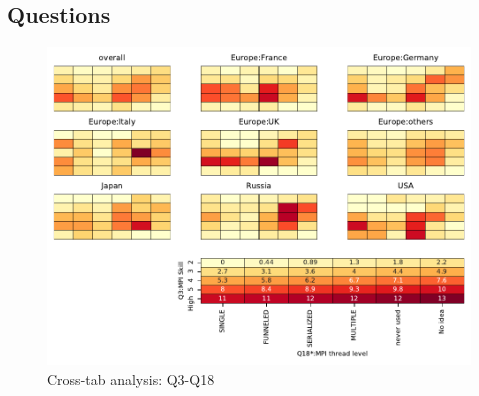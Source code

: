 
\subsection{Questions}


\begin{figure}
\begin{center}
\includegraphics[width=12cm]{../pdfs/Q3-Q18.pdf}
\caption{Cross-tab analysis: Q3-Q18}
\label{fig:Q3-Q18}
\end{center}
\end{figure}
